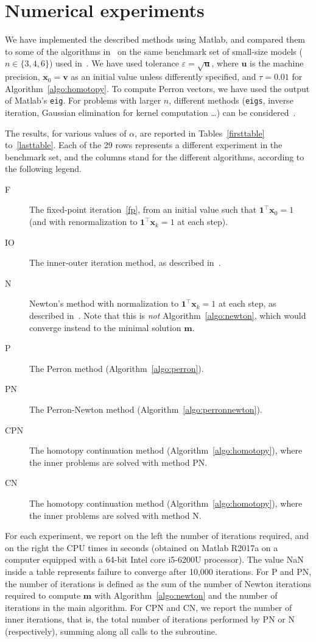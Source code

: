 \documentclass[10pt]{paper}
\begin{document}
\section{Numerical experiments} \label{sec:experiments}
We have implemented the described methods using Matlab, and compared them to some of the algorithms in~\cite{mlpr_github} on the same benchmark set of small-size models ($n \in \{3,4,6\}$) used in~\cite{GleLY15}. We have used tolerance $\varepsilon=\sqrt{\mathbf{u}}$, where $\mathbf{u}$ is the machine precision, ${\mathbf{x}}_0={\mathbf{v}}$ as an initial value unless differently specified, and  $\tau = 0.01$ for Algorithm~\ref{algo:homotopy}. To compute Perron vectors, we have used the output of Matlab's \texttt{eig}. For problems with larger $n$, different methods (\texttt{eigs}, inverse iteration, Gaussian elimination for kernel computation \dots) can be considered~\cite{StewartBook}.

The results, for various values of $\alpha$, are reported in Tables~\ref{firsttable} to~\ref{lasttable}. Each of the 29 rows represents a different experiment in the benchmark set, and the columns stand for the different algorithms, according to the following legend.
\begin{description}
	\item[F] The fixed-point iteration~\eqref{fp}, from an initial value such that ${\mathbf{1}}^\top {\mathbf{x}}_0 = 1$ (and with renormalization to ${\mathbf{1}}^\top {\mathbf{x}}_k = 1$ at each step).
	\item[IO] The inner-outer iteration method, as described in~\cite{GleLY15}.
	\item[N] Newton's method with normalization to ${\mathbf{1}}^\top {\mathbf{x}}_k = 1$ at each step, as described in~\cite{GleLY15}. Note that this is \emph{not} Algorithm~\ref{algo:newton}, which would converge instead to the minimal solution ${\mathbf{m}}$.
	\item[P] The Perron method (Algorithm~\ref{algo:perron}).
	\item[PN] The Perron-Newton method (Algorithm~\ref{algo:perronnewton}).
	\item[CPN] The homotopy continuation method (Algorithm~\ref{algo:homotopy}), where the inner problems are solved with method PN.
	\item[CN] The homotopy continuation method (Algorithm~\ref{algo:homotopy}), where the inner problems are solved with method N.
\end{description}
For each experiment, we report on the left the number of iterations required, and on the right the CPU times in seconds (obtained on Matlab R2017a on a computer equipped with a 64-bit Intel core i5-6200U processor). 
The value NaN inside a table represents failure to converge after 10,000 iterations.
For P and PN, the number of iterations is defined as the sum of the number of Newton iterations required to compute ${\mathbf{m}}$ with Algorithm~\ref{algo:newton} and the number of iterations in the main algorithm.
For CPN and CN, we report the number of inner iterations, that is, the total number of iterations performed by PN or N (respectively), summing along all calls to the subroutine.
\end{document}
